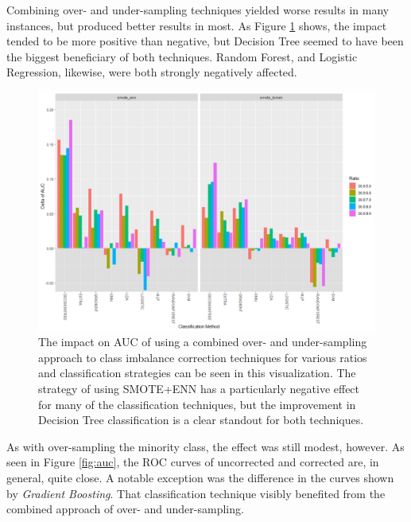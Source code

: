 \documentclass[letterpaper, notitlepage]{report}
\begin{document}
Combining over- and under-sampling techniques yielded worse results in many instances, but produced better results in most. As Figure \ref{fig:combined} shows, the impact tended to be more positive than negative, but Decision Tree seemed to have been the biggest beneficiary of both techniques. Random Forest, and Logistic Regression, likewise, were both strongly negatively affected.
\begin{figure}[!htb]
	\centering
	\includegraphics[width=0.9\linewidth]{./figures/combined.png}
	\caption[Combined Over and Under-sampling]{The impact on AUC of using a combined over- and under-sampling approach to class imbalance correction techniques for various ratios and classification strategies can be seen in this visualization. The strategy of using SMOTE+ENN has a particularly negative effect for many of the classification techniques, but the improvement in Decision Tree classification is a clear standout for both techniques.}
	\label{fig:combined}
\end{figure}

As with over-sampling the minority class, the effect was still modest, however. As seen in Figure \ref{fig:auc}, the ROC curves of uncorrected and corrected are, in general, quite close.  A notable exception was the difference in the curves shown by \textit{Gradient Boosting}. That classification technique visibly benefited from the combined approach of over- and under-sampling.
\end{document}
